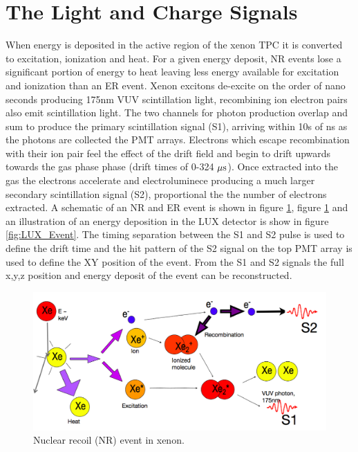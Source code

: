 

\section{The Light and Charge Signals}

When energy is deposited in the active region of the xenon TPC it is converted to excitation, ionization and heat. For a given energy deposit, NR events lose a significant portion of energy to heat leaving less energy available for excitation and ionization than an ER event. Xenon excitons de-excite on the order of nano seconds producing 175nm VUV scintillation light, recombining ion electron pairs also emit scintillation light. The two channels for photon production overlap and sum to produce the primary scintillation signal (S1), arriving within 10s of ns as the photons are collected the  PMT arrays. Electrons which escape recombination with their ion pair feel the effect of the drift field and begin to drift upwards towards the gas phase phase (drift times of 0-324 $\rm \mu s$). Once extracted into the gas the electrons accelerate and electroluminece  producing a much larger secondary scintillation signal (S2), proportional the the number of electrons extracted. A schematic of an NR and ER event is shown in figure \ref{fig:TomS_ER}, figure \ref{fig:TomS_ER} and an illustration of an energy deposition in the LUX detector is show in figure \ref{fig:LUX_Event}. The timing separation between the S1 and S2 pulse is used to define the drift time and the hit pattern of the S2 signal on the top PMT array is used to define the XY position of the event. From the S1 and S2 signals the full x,y,z position and energy deposit of the event can be reconstructed.



 \begin{figure}[h!]\centering
 \includegraphics[width=150mm]{Chapter_LUX_Det/NR_T_Shutt.png}
\caption{Nuclear recoil (NR) event in xenon.}
\label{fig:TomS_ER}
\end{figure}


